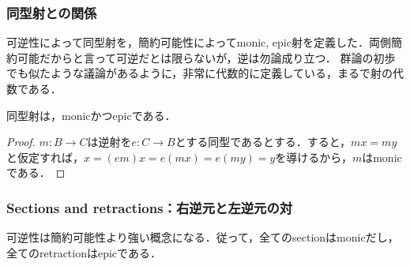 \documentclass[uplatex, dvipdfmx]{jsarticle}
\begin{document}
\subsubsection*{同型射との関係}

可逆性によって同型射を，簡約可能性によってmonic, epic射を定義した．両側簡約可能だからと言って可逆だとは限らないが，逆は勿論成り立つ．
群論の初歩でも似たような議論があるように，非常に代数的に定義している，まるで射の代数である．
\begin{proposition}[可逆な射は簡約可能である]\label{prop-iso_is_monoepi}
    同型射は，monicかつepicである．
\end{proposition}
\begin{proof}
    $m:B\to C$は逆射を$e:C\to B$とする同型であるとする．すると，$mx=my$と仮定すれば，$x=(em)x=e(mx)=e(my)=y$を導けるから，$m$はmonicである．
\end{proof}

\subsubsection{Sections and retractions：右逆元と左逆元の対}
可逆性は簡約可能性より強い概念になる．従って，全てのsectionはmonicだし，全てのretractionはepicである．
\end{document}
